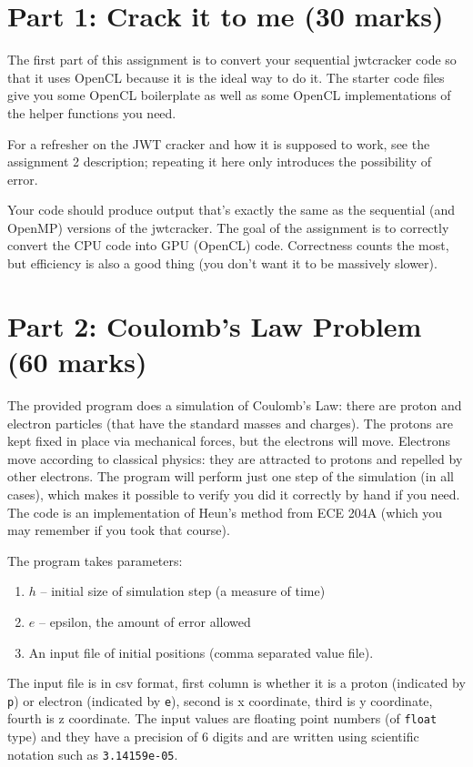 \documentclass[letterpaper,10pt]{article}
\begin{document}
\section*{Part 1: Crack it to me (30 marks)}

The first part of this assignment is to convert your sequential jwtcracker code
so that it uses OpenCL because it is the ideal way to do it. The starter code
files give you some OpenCL boilerplate as well as some OpenCL implementations of
the helper functions you need.

For a refresher on the JWT cracker and how it is supposed to work, see
the assignment 2 description; repeating it here only introduces the possibility
of error. 

Your code should produce output that's exactly the same as the sequential (and
OpenMP) versions of the jwtcracker. The goal of the assignment is to correctly convert the CPU code into GPU (OpenCL) code. Correctness counts the most, but efficiency is also a good thing (you don't want it to be massively slower).

\section*{Part 2: Coulomb's Law Problem (60 marks)}

The provided program does a simulation of Coulomb's Law: there are proton and electron particles (that have the standard masses and charges). The protons are kept fixed in place via mechanical forces, but the electrons will move. Electrons move according to classical physics: they are attracted to protons and repelled by other electrons. The program will perform just one step of the simulation (in all cases), which makes it possible to verify you did it correctly by hand if you need. The code is an implementation of Heun's method from ECE 204A (which you may remember if you took that course).

The program takes parameters:
\begin{enumerate}
\item $h$ -- initial size of simulation step (a measure of time) 
\item $e$ -- epsilon, the amount of error allowed
\item An input file of initial positions (comma separated value file).
\end{enumerate}

The input file is in csv format, first column is whether it is a proton (indicated by \texttt{p}) or electron (indicated by \texttt{e}), second is x coordinate, third is y coordinate, fourth is z coordinate. The input values are floating point numbers (of \texttt{float} type) and they have a precision of 6 digits and are written using scientific notation such as \texttt{3.14159e-05}. 
\end{document}
